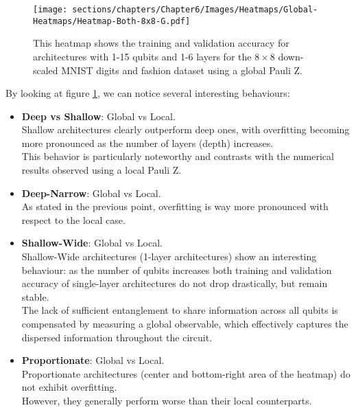 
\begin{figure}[h]
    \centering
    \texttt{[image: sections/chapters/Chapter6/Images/Heatmaps/Global-Heatmaps/Heatmap-Both-8x8-G.pdf]}
    \caption{This heatmap shows the training and validation accuracy for architectures with 1-15 qubits and
    1-6 layers for the $8\times8$ down-scaled MNIST digits and fashion dataset using a global Pauli Z.}
    \label{fig:heatmap-8x8-G}
\end{figure}


By looking at figure \ref{fig:heatmap-8x8-G}, we can notice 
several interesting behaviours:

\begin{itemize}
    \item \textbf{Deep vs Shallow}: Global vs Local.\\
    Shallow architectures clearly outperform deep ones, with overfitting becoming more pronounced 
    as the number of layers (depth) increases.\\
    This behavior is particularly noteworthy and contrasts with the numerical results observed 
    using a local Pauli Z.
    \item \textbf{Deep-Narrow}: Global vs Local.\\
    As stated in the previous point, overfitting is way more pronounced with respect to the local case.
    \item \textbf{Shallow-Wide}: Global vs Local.\\
    Shallow-Wide architectures (1-layer architectures) show an interesting behaviour: as the number of 
    qubits increases both training and validation accuracy of single-layer architectures 
    do not drop drastically, but remain stable.\\
    The lack of sufficient entanglement to share information across all qubits is compensated by 
    measuring a global observable, which effectively captures the dispersed information throughout the 
    circuit.
    \item \textbf{Proportionate}: Global vs Local.\\
    Proportionate architectures (center and bottom-right area of the heatmap) do not exhibit overfitting. \\
    However, they generally perform worse than their local counterparts.
 \end{itemize}
